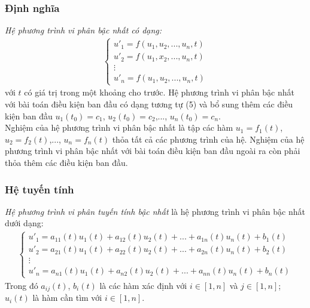 \subsubsection{Định nghĩa}
\textit{Hệ phương trình vi phân bậc nhất có dạng:}
\begin{align}
    \begin{cases}
        u'_1 = f(u_1,u_2,...,u_n,t)\\
        u'_2 = f(u_1,x_2,...,u_n,t)\\
        \vdots\\
        u'_n = f(u_1,u_2,...,u_n,t)
    \end{cases}
\end{align}
với $t$ có giá trị trong một khoảng cho trước. Hệ phương trình vi phân bậc nhất với bài toán điều kiện ban đầu có dạng tương tự (5) và bổ sung thêm các điều kiện ban đầu $u_1(t_0) = c_1$, $u_2(t_0) = c_2$,..., $u_n(t_0) = c_n$.\\
Nghiệm của hệ phương trình vi phân bậc nhất là tập các hàm $u_1 = f_1(t)$, $u_2 = f_2(t)$,..., $u_n = f_n(t)$ thỏa tất cả các phương trình của hệ. Nghiệm của hệ phương trình vi phân bậc nhất với bài toán điều kiện ban đầu ngoài ra còn phải thỏa thêm các điều kiện ban đầu.
\subsubsection{Hệ tuyến tính}
\textit{Hệ phương trình vi phân tuyến tính bậc nhất} là hệ phương trình vi phân bậc nhất dưới dạng:
\begin{align}
    \begin{cases}
        u'_1 = a_{11}(t)u_1(t) + a_{12}(t)u_2(t) + ... + a_{1n}(t)u_n(t) + b_1(t)\\
        u'_2 = a_{21}(t)u_1(t) + a_{22}(t)u_2(t) + ... + a_{2n}(t)u_n(t) + b_2(t)\\
        \vdots\\
        u'_n = a_{n1}(t)u_1(t) + a_{n2}(t)u_2(t) + ... + a_{nn}(t)u_n(t) + b_n(t)
    \end{cases}
\end{align}
Trong đó $a_{ij}(t)$, $b_{i}(t)$ là các hàm xác định với $i\in [1,n]$ và $j\in [1,n]$; $u_i(t)$ là hàm cần tìm với $i\in [1,n]$.
